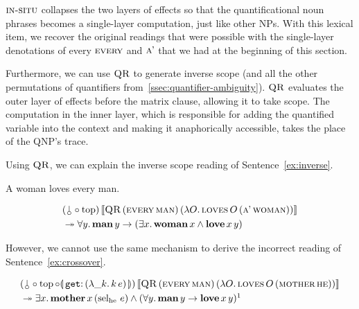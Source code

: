 $\textsc{in-situ}$ collapses the two layers of effects so that the
quantificational noun phrases becomes a single-layer computation, just like
other NPs. With this lexical item, we recover the original readings that
were possible with the single-layer denotations of every $\textsc{every}$ and
$\textsc{a'}$ that we had at the beginning of this section.

Furthermore, we can use $\textsc{QR}$ to generate inverse scope (and all the
other permutations of quantifiers
from~\ref{ssec:quantifier-ambiguity}). $\textsc{QR}$ evaluates the outer layer
of effects before the matrix clause, allowing it to take scope. The
computation in the inner layer, which is responsible for adding the
quantified variable into the context and making it anaphorically
accessible, takes the place of the QNP's trace.

Using $\textsc{QR}$, we can explain the inverse scope reading of
Sentence~\ref{ex:inverse}.

\begin{exe}
  \ex A woman loves every man. \label{ex:inverse}
\end{exe}

\begin{align*}
  &\ap{(\cherry \circ \TOP)}{\sem{\app{\abs{QR}}{(\ap{\abs{every}}{\abs{man}})}{(\lam{O}{\app{\abs{loves}}{O}{(\ap{\abs{a'}}{\abs{woman}})}})}}} \\
  &\tto \forall y.\, \ap{\obj{man}}{y} \to (\exists x.\, \ap{\obj{woman}}{x} \land \app{\obj{love}}{x}{y})
\end{align*}

However, we cannot use the same mechanism to derive the incorrect reading
of Sentence~\ref{ex:crossover}.

\begin{align*}
  &\ap{(\cherry \circ \TOP \circ \banana{\onto{\op{get}}{(\lam{\_ k}{\ap{k}{e}})}})}{\sem{\app{\abs{QR}}{(\ap{\abs{every}}{\abs{man}})}{(\lam{O}{\app{\abs{loves}}{O}{(\ap{\abs{mother}}{\abs{he}})}})}}} \\
  &\tto \exists x.\, \app{\obj{mother}}{x}{(\ap{\selhe}{e})} \land (\forall y.\, \ap{\obj{man}}{y} \to \app{\obj{love}}{x}{y})\footnotemark
\end{align*}

